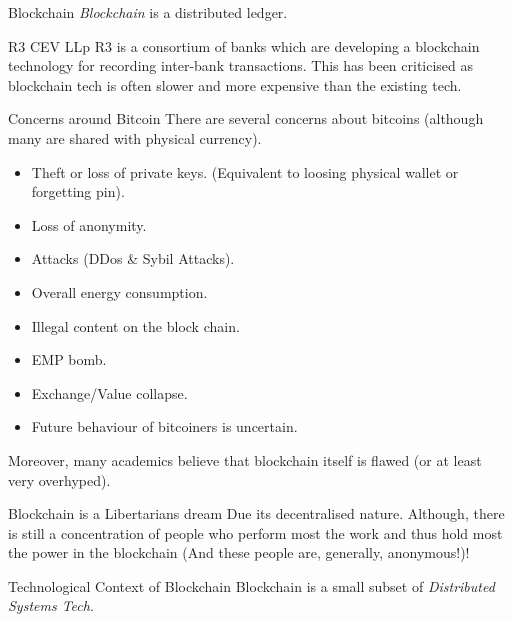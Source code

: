 \documentclass[11pt,a4paper]{article}
\begin{document}
  \begin{definition}{Blockchain}
    \textit{Blockchain} is a distributed ledger.
  \end{definition}

  \begin{remark}{R3 CEV LLp}
    R3 is a consortium of banks which are developing a blockchain technology for recording inter-bank transactions. This has been criticised as blockchain tech is often slower and more expensive than the existing tech.
  \end{remark}

  \begin{remark}{Concerns around Bitcoin}
    There are several concerns about bitcoins (although many are shared with physical currency).
    \begin{itemize}
      \item Theft or loss of private keys. (Equivalent to loosing physical wallet or forgetting pin).
      \item Loss of anonymity.
      \item Attacks (DDos \& Sybil Attacks).
      \item Overall energy consumption.
      \item Illegal content on the block chain.
      \item EMP bomb.
      \item Exchange/Value collapse.
      \item Future behaviour of bitcoiners is uncertain.
    \end{itemize}
    Moreover, many academics believe that blockchain itself is flawed (or at least very overhyped).
  \end{remark}

  \begin{remark}{Blockchain is a Libertarians dream}
    Due its decentralised nature. Although, there is still a concentration of people who perform most the work and thus hold most the power in the blockchain (And these people are, generally, anonymous!)!
  \end{remark}

  \begin{proposition}{Technological Context of Blockchain}
    Blockchain is a small subset of \textit{Distributed Systems Tech}.
  \end{proposition}
\end{document}

